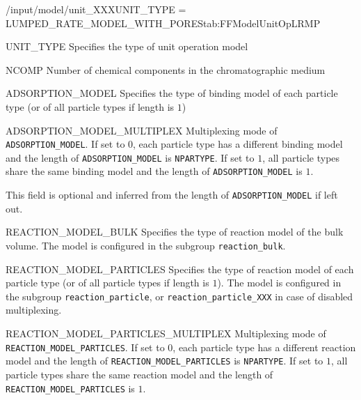 \begin{condsubgroup}{/input/model/unit\_XXX}{UNIT\_TYPE = LUMPED\_RATE\_MODEL\_WITH\_PORES}{tab:FFModelUnitOpLRMP}
  \begin{dataset}[type=string,range={\texttt{LUMPED\_RATE\_MODEL\_WITH\_PORES}},length=1]{UNIT\_TYPE}
    Specifies the type of unit operation model
  \end{dataset}
  \begin{dataset}[type=int,range={$\geq 1$},length=1]{NCOMP}
    Number of chemical components in the chromatographic medium
  \end{dataset}
  \begin{dataset}[type=string,range={See Section~\ref{sec:FFAdsorption}},length={$1$ / \texttt{NPARTYPE}}]{ADSORPTION\_MODEL}
    Specifies the type of binding model of each particle type (or of all particle types if length is $1$)
  \end{dataset}
  \begin{dataset}[unit=--,type=int,range={$\{0, 1\}$},length={1}]{ADSORPTION\_MODEL\_MULTIPLEX}
    Multiplexing mode of \texttt{ADSORPTION\_MODEL}.
    If set to $0$, each particle type has a different binding model and the length of \texttt{ADSORPTION\_MODEL} is \texttt{NPARTYPE}.
    If set to $1$, all particle types share the same binding model and the length of \texttt{ADSORPTION\_MODEL} is $1$.

    This field is optional and inferred from the length of \texttt{ADSORPTION\_MODEL} if left out.
  \end{dataset}
  \begin{dataset}[type=string,range={See Section~\ref{sec:FFReaction}},length=1]{REACTION\_MODEL\_BULK}
    Specifies the type of reaction model of the bulk volume.
    The model is configured in the subgroup \texttt{reaction\_bulk}.
  \end{dataset}
  \begin{dataset}[type=string,range={See Section~\ref{sec:FFReaction}},length={$1$ / \texttt{NPARTYPE}}]{REACTION\_MODEL\_PARTICLES}
    Specifies the type of reaction model of each particle type (or of all particle types if length is $1$).
    The model is configured in the subgroup \texttt{reaction\_particle}, or \texttt{reaction\_particle\_XXX} in case of disabled multiplexing.
  \end{dataset}
  \begin{dataset}[unit=--,type=int,range={$\{0, 1\}$},length={1}]{REACTION\_MODEL\_PARTICLES\_MULTIPLEX}
    Multiplexing mode of \texttt{REACTION\_MODEL\_PARTICLES}.
    If set to $0$, each particle type has a different reaction model and the length of \texttt{REACTION\_MODEL\_PARTICLES} is \texttt{NPARTYPE}.
    If set to $1$, all particle types share the same reaction model and the length of \texttt{REACTION\_MODEL\_PARTICLES} is $1$.


\end{dataset}
\end{condsubgroup}

